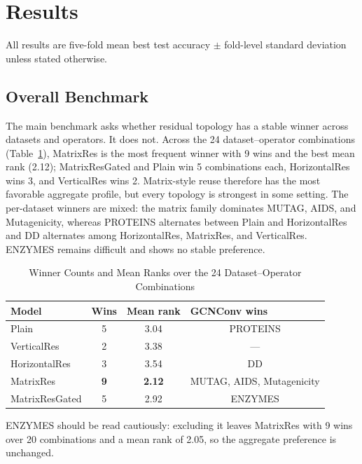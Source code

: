 \section{Results}
\label{sec:results}

All results are five-fold mean best test accuracy \(\pm\) fold-level standard
deviation unless stated otherwise.

\subsection{Overall Benchmark}
\label{sec:res-overall}

The main benchmark asks whether residual topology has a stable winner across
datasets and operators. It does not. Across the 24 dataset--operator
combinations (Table~\ref{tab:operator_wins}), MatrixRes is the most frequent
winner with 9 wins and the best mean rank (2.12); MatrixResGated and Plain win 5
combinations each, HorizontalRes wins 3, and VerticalRes wins 2. Matrix-style
reuse therefore has the most favorable aggregate profile, but every topology is
strongest in some setting. The per-dataset winners are mixed: the matrix family
dominates MUTAG, AIDS, and Mutagenicity, whereas PROTEINS alternates between
Plain and HorizontalRes and DD alternates among HorizontalRes, MatrixRes, and
VerticalRes. ENZYMES remains difficult and shows no stable preference.

\begin{table}[!t]
\centering
\caption{Winner Counts and Mean Ranks over the 24 Dataset--Operator
Combinations}
\label{tab:operator_wins}
\footnotesize
\begin{tabular}{@{}lccc@{}}
\toprule
Model & Wins & Mean rank & \multicolumn{1}{l}{GCNConv wins} \\
\midrule
Plain          & 5 & 3.04 & PROTEINS \\
VerticalRes    & 2 & 3.38 & --- \\
HorizontalRes  & 3 & 3.54 & DD \\
MatrixRes      & \textbf{9} & \textbf{2.12} & MUTAG, AIDS, Mutagenicity \\
MatrixResGated & 5 & 2.92 & ENZYMES \\
\bottomrule
\end{tabular}
\end{table}

ENZYMES should be read cautiously: excluding it leaves MatrixRes with 9 wins
over 20 combinations and a mean rank of 2.05, so the aggregate preference is
unchanged.

